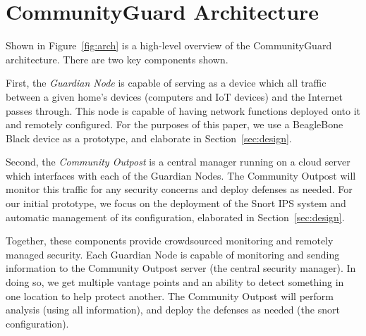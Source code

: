 \section{CommunityGuard Architecture}
\label{sec:arch}


Shown in Figure~\ref{fig:arch} is a high-level overview of the CommunityGuard architecture.
There are two key components shown.  

First, the \emph{Guardian Node} is capable of
serving as a device which all traffic between a given home's devices (computers and IoT devices)
and the Internet passes through.  This node is capable of having network functions
deployed onto it and remotely configured.  For the purposes of this paper,
we use a BeagleBone Black device as a prototype, and elaborate in Section~\ref{sec:design}.

Second, the \emph{Community Outpost} is a central manager running on a cloud server which
interfaces with each of the Guardian Nodes. The Community Outpost will monitor this 
traffic for any security concerns and deploy defenses as needed.   
For our initial prototype, we focus on the deployment of the Snort IPS system 
and automatic management of its configuration, elaborated in Section~\ref{sec:design}.

Together, these components provide crowdsourced monitoring and remotely managed security.  
Each Guardian Node is capable of monitoring and sending information to the Community Outpost server
(the central security manager).  In doing so, we get multiple vantage points and an ability 
to detect something in one location to help protect another.  
The Community Outpost will perform analysis (using all information), and deploy the 
defenses as needed (the snort configuration).  
%
%
%

